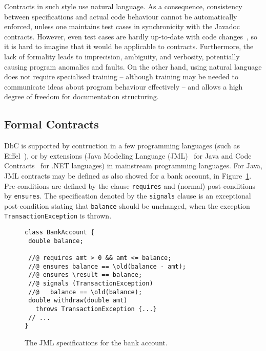 Contracts in such style use natural language. As a consequence, consistency between specifications and actual code behaviour cannot be automatically enforced, unless one maintains test cases in synchronicity with the Javadoc contracts. However, even test cases are hardly up-to-date with code changes~\cite{Hao2013}, so it is hard to imagine that it would be applicable to contracts. 
Furthermore, the lack of formality leads to imprecision, ambiguity, and verbosity, potentially causing program anomalies and faults.
On the other hand, using natural language does not require specialised training -- although training may be needed to communicate
ideas about program behaviour effectively -- and allows a high degree of freedom for documentation structuring. 


\subsection{Formal Contracts}


DbC is supported by contruction in a few programming languages (such as Eiffel~\cite{eiffel}), or by extensions (Java Modeling Language (JML)~\cite{jml} for Java and Code Contracts~\cite{codeContractsPaper} for .NET languages) in mainstream programming languages.
For Java, JML contracts may be defined as also showed for a bank account, in Figure~\ref{Fig-JML-Bank}. Pre-conditions
are defined by the clause {\lstinline!requires!} and (normal) post-conditions by {\lstinline!ensures!}. The specification
denoted by the {\lstinline!signals!} clause
is an exceptional post-condition stating that {\lstinline!balance!} should be unchanged, when the exception \texttt{TransactionExcep\-tion} is thrown.

\begin{figure}
\begin{lstlisting}[basicstyle=\footnotesize\ttfamily,name=figxpi]
class BankAccount {
 double balance;

 //@ requires amt > 0 && amt <= balance;
 //@ ensures balance == \old(balance - amt);
 //@ ensures \result == balance;
 //@ signals (TransactionException) 
 //@   balance == \old(balance);
 double withdraw(double amt) 
   throws TransactionException {...}
 // ...
}
\end{lstlisting}
\caption{The JML specifications for the bank account.}
\label{Fig-JML-Bank}
\end{figure}

